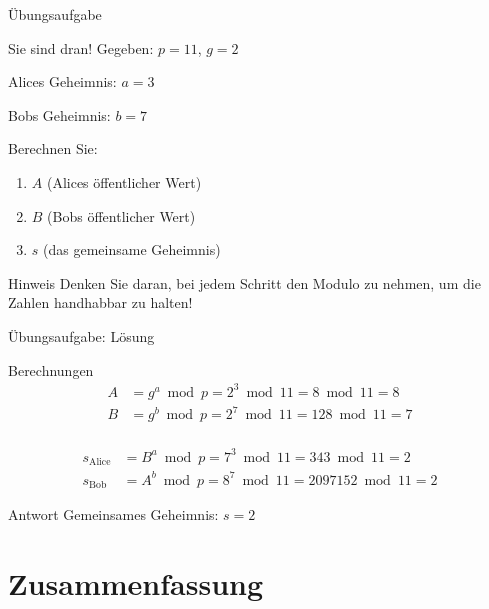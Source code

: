 \documentclass[handout]{beamer}
\begin{document}
\begin{frame}{Übungsaufgabe}
\begin{block}{Sie sind dran!}
Gegeben: $p = 11$, $g = 2$

Alices Geheimnis: $a = 3$

Bobs Geheimnis: $b = 7$

\vspace{0.5cm}

Berechnen Sie:
\begin{enumerate}
    \item $A$ (Alices öffentlicher Wert)
    \item $B$ (Bobs öffentlicher Wert)
    \item $s$ (das gemeinsame Geheimnis)
\end{enumerate}
\end{block}

\pause

\begin{alertblock}{Hinweis}
Denken Sie daran, bei jedem Schritt den Modulo zu nehmen, um die Zahlen handhabbar zu halten!
\end{alertblock}
\end{frame}

\begin{frame}{Übungsaufgabe: Lösung}
\begin{block}{Berechnungen}
\begin{align*}
A &= g^a \bmod p = 2^3 \bmod 11 = 8 \bmod 11 = 8 \\
B &= g^b \bmod p = 2^7 \bmod 11 = 128 \bmod 11 = 7 \\
\end{align*}

\pause

\begin{align*}
s_{\text{Alice}} &= B^a \bmod p = 7^3 \bmod 11 = 343 \bmod 11 = 2 \\
s_{\text{Bob}} &= A^b \bmod p = 8^7 \bmod 11 = 2097152 \bmod 11 = 2
\end{align*}
\end{block}

\pause

\begin{exampleblock}{Antwort}
Gemeinsames Geheimnis: $s = 2$
\end{exampleblock}
\end{frame}

\section{Zusammenfassung}
\end{document}

